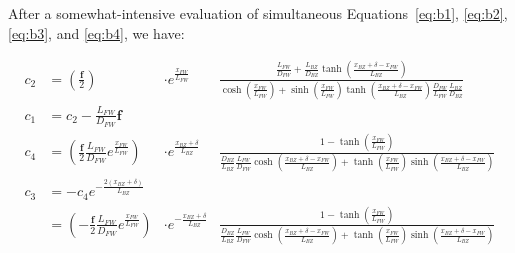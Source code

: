 \documentclass[a4paper, 12pt]{article}
\newcommand{\ve}[1]{\boldsymbol{#1}}
\newcommand{\flux}[0]{\ve{f}}
\newcommand{\xFW}[0]{x_{FW}}
\newcommand{\DFW}[0]{D_{FW}}
\newcommand{\LFW}[0]{L_{FW}}
\newcommand{\DBZ}[0]{D_{BZ}}
\newcommand{\LBZ}[0]{L_{BZ}}
\newcommand{\eBZ}[0]{x_{BZ}+\delta}
\begin{document}
After a somewhat-intensive evaluation of simultaneous Equations~\ref{eq:b1}, \ref{eq:b2}, \ref{eq:b3}, and \ref{eq:b4}, we have:

\begin{align}
    c_2 &= \left(\frac{ \flux }{2}\right) &\cdot e^{\frac{\xFW }{\LFW } } &\frac{ \frac{\LFW }{\DFW } + \frac{\LBZ }{\DBZ }\tanh\left(\frac{\eBZ -\xFW}{\LBZ } \right)}{\cosh\left(\frac{\xFW }{\LFW }\right) + \sinh{\left(\frac{\xFW }{\LFW }\right)} \tanh\left(\frac{\eBZ -\xFW}{\LBZ } \right) \frac{\DFW }{\LFW }\frac{\LBZ }{\DBZ }}\label{eq:b1a}\\
    c_1 &= c_2 - \frac{\LFW }{\DFW }\flux\\
    c_4 &= \left(\frac{\flux }{2}\frac{\LFW }{\DFW } e^{\frac{\xFW }{\LFW } }\right) &\cdot e^{\frac{\eBZ }{\LBZ }} &\frac{1-\tanh\left(\frac{\xFW }{\LFW }\right)}{\frac{\DBZ }{\LBZ } \frac{\LFW }{\DFW } \cosh\left(\frac{\eBZ-\xFW}{\LBZ }\right) + \tanh\left(\frac{\xFW }{\LFW }\right) \sinh\left(\frac{\eBZ - \xFW }{\LBZ }\right)} \\
    c_3 &= -c_4 e^{-\frac{2(\eBZ )}{\LBZ }}\nonumber\\
        &= \left(-\frac{\flux }{2} \frac{\LFW }{\DFW } e^{\frac{\xFW }{\LFW } }\right) &\cdot e^{-\frac{\eBZ }{\LBZ }} &\frac{1-\tanh\left(\frac{\xFW }{\LFW }\right)}{\frac{\DBZ }{\LBZ } \frac{\LFW }{\DFW } \cosh\left(\frac{\eBZ-\xFW}{\LBZ }\right) + \tanh\left(\frac{\xFW }{\LFW }\right) \sinh\left(\frac{\eBZ - \xFW }{\LBZ }\right)}\label{eq:b4a}
\end{align}
\end{document}
